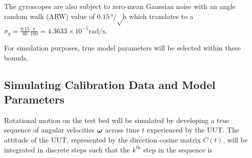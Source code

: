 The gyroscopes are also subject to zero-mean Gaussian noise with an angle random walk (ARW) value of $0.15 \unit{\degree\per\sqrt\hour}$ which translates to a $\sigma_g = \frac{0.15}{60}\frac{\pi}{180} = 4.3633 \times 10^{-5} \unit{\radian\per\second}$.

For simulation purposes, true model parameters will be selected within these bounds.


%
%
%
%
%
%


\subsection{Simulating Calibration Data and Model Parameters}

Rotational motion on the test bed will be simulated by developing a true sequence of angular velocities $\boldsymbol{\omega}$ across time $t$ experienced by the UUT. The attitude of the UUT, represented by the direction cosine matrix $C\left(t\right)$, will be integrated in discrete steps such that the $k^{\textrm{th}}$ step in the sequence is 


